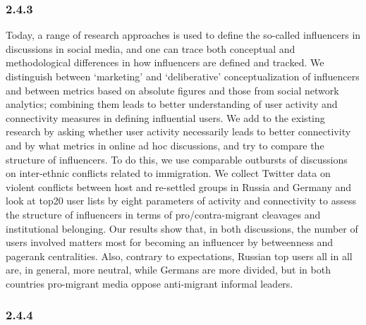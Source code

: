 \subsubsection{2.4.3}

Today, a range of research approaches is used to define the so-called influencers in discussions in social media, and one can trace both conceptual and methodological differences in how influencers are defined and tracked. We distinguish between ‘marketing’ and ‘deliberative’ conceptualization of influencers and between metrics based on absolute figures and those from social network analytics; combining them leads to better understanding of user activity and connectivity measures in defining influential users. We add to the existing research by asking whether user activity necessarily leads to better connectivity and by what metrics in online ad hoc discussions, and try to compare the structure of influencers. To do this, we use comparable outbursts of discussions on inter-ethnic conflicts related to immigration. We collect Twitter data on violent conflicts between host and re-settled groups in Russia and Germany and look at top20 user lists by eight parameters of activity and connectivity to assess the structure of influencers in terms of pro/contra-migrant cleavages and institutional belonging. Our results show that, in both discussions, the number of users involved matters most for becoming an influencer by betweenness and pagerank centralities. Also, contrary to expectations, Russian top users all in all are, in general, more neutral, while Germans are more divided, but in both countries pro-migrant media oppose anti-migrant informal leaders.

\subsubsection{2.4.4}

